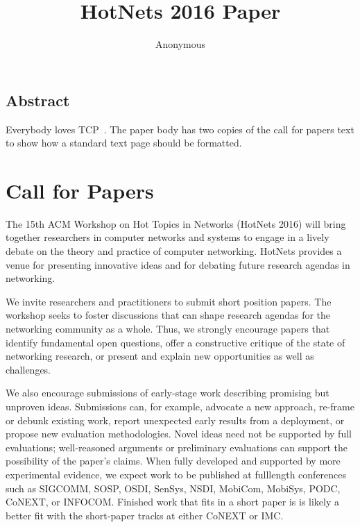 \documentclass{hotnets16}
\begin{document}
 {}
\date{}


\title{HotNets 2016 Paper}

\author{Anonymous}

\maketitle


\subsection*{Abstract}

Everybody loves TCP~\cite{vanjacobson}. The paper body has two copies
of the call for papers text to show how a standard text page should be
formatted.

\section{Call for Papers}

The 15th ACM Workshop on Hot Topics in Networks (HotNets 2016) will
bring together researchers in computer networks and systems to engage
in a lively debate on the theory and practice of computer networking.
HotNets provides a venue for presenting innovative ideas 
and for debating future research agendas in networking.

We invite researchers and practitioners to submit short position
papers. The workshop seeks to foster discussions
that can shape research agendas for the networking community as a
whole. Thus, we strongly encourage papers that identify fundamental
open questions, offer a constructive critique of the state of
networking research, or present and explain new opportunities as well
as challenges.

We also encourage submissions of early-stage work describing promising
but unproven ideas. Submissions can, for example, advocate a new
approach, re-frame or debunk existing work, report unexpected early
results from a deployment, or propose new evaluation
methodologies. Novel ideas need not be supported by full evaluations; 
well-reasoned arguments or preliminary
evaluations can support the possibility of the paper’s claims. 
When fully developed and supported by more experimental
evidence, we expect work to be published at fulllength conferences
such as SIGCOMM, SOSP, OSDI, SenSys, NSDI, MobiCom, MobiSys, PODC,
CoNEXT, or INFOCOM. Finished work that fits in a short paper is 
is likely a better fit with the short-paper tracks at either CoNEXT or IMC.
\end{document}
